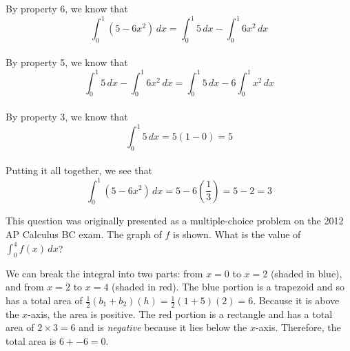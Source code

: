 \begin{Answer}[ref=defint2]
By property 6, we know that $$\int_{0}^{1} (5-6x^2)\,dx = \int_{0}^{1} 
5\,dx - \int_{0}^{1} 6x^2\,dx$$\\
By property 5, we know that $$\int_{0}^{1} 5\,dx - \int_{0}^{1} 6x^2\,
dx = \int_{0}^{1} 5\,dx - 6\int_{0}^{1} x^2\,dx$$\\
By property 3, we know that $$\int_{0}^{1} 5\,dx = 5(1 - 0) = 5$$\\
Putting it all together, we see that $$\int_{0}^{1} (5-6x^2)\,dx = 5 
- 6(\frac{1}{3}) = 5 - 2 = 3$$
\end{Answer}

\begin{Exercise}[label=defint3]
	This question was originally presented as a multiple-choice problem 
	on the 2012 AP Calculus BC exam. The graph of $f$ is shown. What is 
	the value of $\int_{0}^{4} f(x)\,dx$?\\
\end{Exercise}

\begin{Answer}[ref=defint3]
We can break the integral into two parts: from $x = 0$ to $x = 2$ 
(shaded in blue), and from $x = 2$ to $x = 4$ (shaded in red). The 
blue portion is a trapezoid and so has a total area of $\frac{1}{2} 
(b_1 + b_2) (h) = \frac{1}{2} (1 + 5) (2) = 6$. Because it is above 
the $x$-axis, the area is positive. The red portion is a rectangle and 
has a total area of $2 \times 3 = 6$ and is \textit{negative} because 
it lies below the $x$-axis. Therefore, the total area is $6 + -6 = 0$. \\

\end{Answer}

